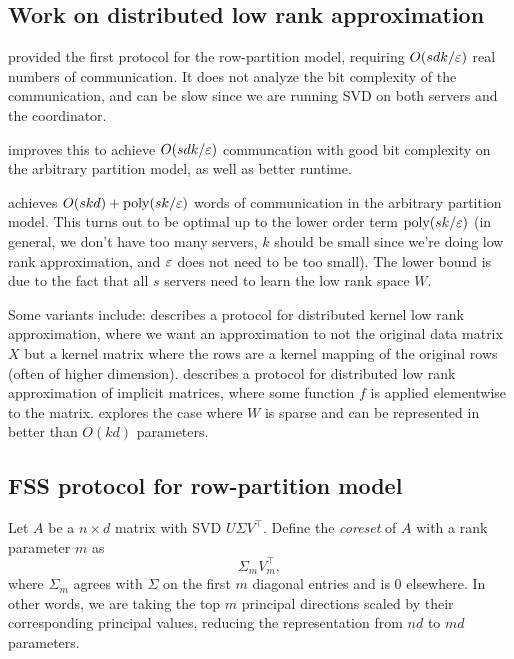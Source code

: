 \documentclass{article}
\begin{document}
\subsection{Work on distributed low rank approximation}
\cite{FSS} provided the first protocol for the row-partition model, requiring $O(sdk/\varepsilon )$ real numbers of communication. It does not analyze the bit complexity of the communication, and can be slow since we are running SVD on both servers and the coordinator. 

\cite{KVW} improves this to achieve $O(sdk/\varepsilon )$ communcation with good bit complexity on the arbitrary partition model, as well as better runtime. 

\cite{BWZ} achieves $O(skd) + \operatorname{poly}(sk/\varepsilon )$ words of communication in the arbitrary partition model. This turns out to be optimal up to the lower order term $\operatorname{poly}(sk/\varepsilon )$ (in general, we don't have too many servers, $k$ should be small since we're doing low rank approximation, and $\varepsilon $ does not need to be too small). The lower bound is due to the fact that all $s$ servers need to learn the low rank space $W$. 

Some variants include: \cite{BLSWX} describes a protocol for distributed kernel low rank approximation, where we want an approximation to not the original data matrix $X$ but a kernel matrix where the rows are a kernel mapping of the original rows (often of higher dimension). \cite{WZ} describes a protocol for distributed low rank approximation of implicit matrices, where some function $f$ is applied elementwise to the matrix. \cite{BWZ} explores the case where $W$ is sparse and can be represented in better than $O(kd)$ parameters. 

\subsection{FSS protocol for row-partition model}

\begin{defi}[Coreset]
    Let $A$ be a $n\times d$ matrix with SVD $U\Sigma V^{\top} $. Define the \emph{coreset} of $A$ with a rank parameter $m$ as 
    \[
        \Sigma _m V_m ^{\top} ,
    \]
    where $\Sigma _m $ agrees with $\Sigma $ on the first $m$ diagonal entries and is $0$ elsewhere. In other words, we are taking the top $m$ principal directions scaled by their corresponding principal values, reducing the representation from $nd$ to $md$ parameters. 
\end{defi}
\end{document}
